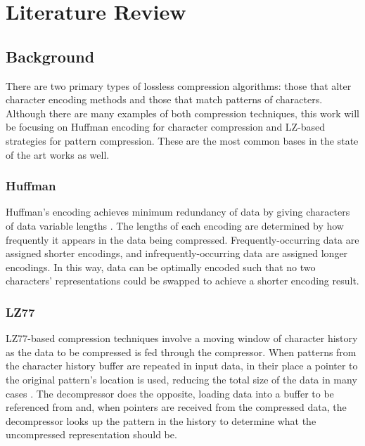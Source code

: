 \documentclass[doublespace,draft,nopageskip]{VTthesis} %
\begin{document}

\chapter{Literature Review} \label{ch:related_works}
\section{Background}\label{se:background}
There are two primary types of lossless compression algorithms: those that alter character encoding methods and those that match patterns of characters. Although there are many examples of both compression techniques, this work will be focusing on Huffman encoding for character compression and LZ-based strategies for pattern compression. These are the most common bases in the state of the art works as well.

\subsection{Huffman}\label{ss:huffman}
Huffman's encoding achieves minimum redundancy of data by giving characters of data variable lengths \cite{huffman}. The lengths of each encoding are determined by how frequently it appears in the data being compressed. Frequently-occurring data are assigned shorter encodings, and infrequently-occurring data are assigned longer encodings. In this way, data can be optimally encoded such that no two characters' representations could be swapped to achieve a shorter encoding result. 

\subsection{LZ77}\label{ss:lz77}
LZ77-based compression techniques involve a moving window of character history as the data to be compressed is fed through the compressor. When patterns from the character history buffer are repeated in input data, in their place a pointer to the original pattern's location is used, reducing the total size of the data in many cases \cite{lz77}. The decompressor does the opposite, loading data into a buffer to be referenced from and, when pointers are received from the compressed data, the decompressor looks up the pattern in the history to determine what the uncompressed representation should be.
\end{document}
